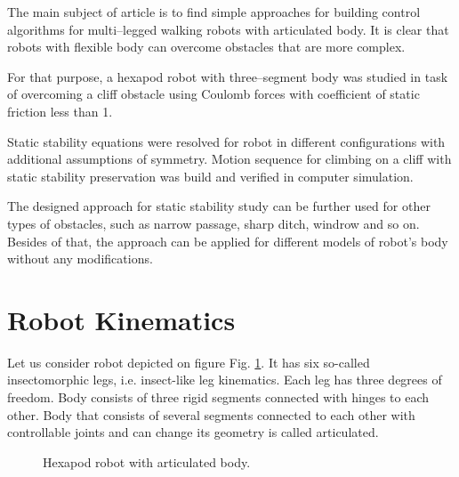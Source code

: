 \documentclass{ws-procs9x6}
\begin{document}
The main subject of article is to find simple approaches for building control algorithms for multi--legged walking robots with articulated body. It is clear that robots with flexible body can overcome obstacles that are more complex.

For that purpose, a hexapod robot with three--segment body was studied in task of overcoming a cliff obstacle using Coulomb forces with coefficient of static friction less than 1. 

Static stability equations were resolved for robot in different configurations with additional assumptions of symmetry. Motion sequence for climbing on a cliff with static stability preservation was build and verified in computer simulation.

The designed approach for static stability study can be further used for other types of obstacles, such as narrow passage, sharp ditch, windrow and so on. Besides of that, the approach can be applied for different models of robot's body without any modifications.


\section{Robot Kinematics}
Let us consider robot depicted on figure Fig. \ref{aba:robot_1}. It has six so-called insectomorphic legs, i.e. insect-like leg kinematics. Each leg has three degrees of freedom. Body consists of three rigid segments connected with hinges to each other. Body that consists of several segments connected to each other with controllable joints and can change its geometry is called articulated.

\begin{figure}
  \begin{center}
  \end{center}
  \caption{Hexapod robot with articulated body.}
  \label{aba:robot_1}
\end{figure}
\end{document}
